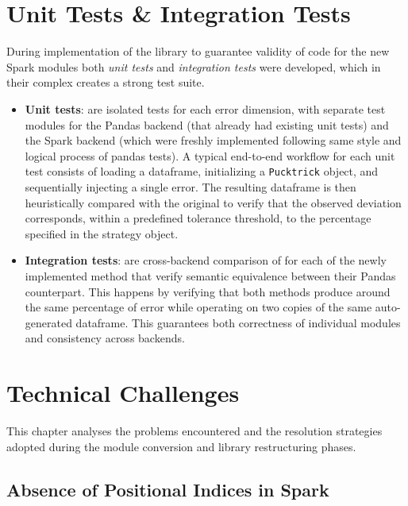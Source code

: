 \documentclass[../main.tex]{subfiles}
\begin{document}
\section{Unit Tests \& Integration Tests}
\label{sec:Library_unite_integration_tests}

During implementation of the library to guarantee validity of code for the new Spark modules both \emph{unit tests} and \emph{integration tests} were developed, which in their complex creates a strong test suite. 

\begin{itemize}
  \item \textbf{Unit tests}: are isolated tests for each error dimension, with separate test modules for the Pandas backend (that already had existing unit tests) and the Spark backend (which were freshly implemented following same style and logical process of pandas tests). A typical end-to-end workflow for each unit test consists of loading a dataframe, initializing a \texttt{Pucktrick} object, and sequentially injecting a single error. The resulting dataframe is then heuristically compared with the original to verify that the observed deviation corresponds, within a predefined tolerance threshold, to the percentage specified in the strategy object.

  
  \item \textbf{Integration tests}: are cross-backend comparison of for each of the newly implemented method that verify semantic equivalence between their Pandas counterpart. This happens by verifying that both methods produce around the same percentage of error while operating on two copies of the same auto-generated dataframe. This guarantees both correctness of individual modules and consistency across backends.
\end{itemize}




\newpage
\section{Technical Challenges}
\label{sec:Technical_challenges}

This chapter analyses the problems encountered and the resolution strategies adopted during the module conversion and library restructuring phases.

\subsection{Absence of Positional Indices in Spark}
\label{sec:no_index}
\end{document}
